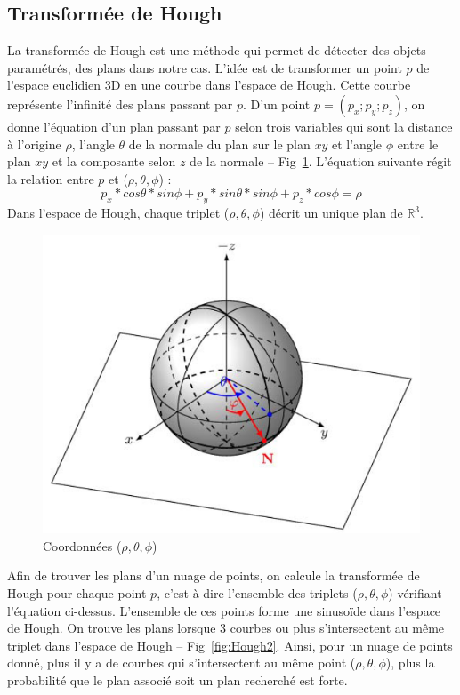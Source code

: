 ﻿\documentclass[12pt, twoside]{article}
\begin{document}
\subsection{Transformée de Hough}
La transformée de Hough est une méthode qui permet de détecter des objets paramétrés, des plans dans notre cas. L’idée est de transformer un point $p$ de l’espace euclidien 3D en une courbe dans l’espace de Hough. Cette courbe représente l’infinité des plans passant par $p$. D’un point $p = (p_x; p_y; p_z)$, on donne l’équation d’un plan passant par $p$ selon trois variables qui sont la distance à l’origine $\rho$, l’angle $\theta$ de la normale du plan sur le plan $xy$ et l’angle $\phi$ entre le plan $xy$ et la composante selon $z$ de la normale -- Fig~\ref{fig:Hough1}. L’équation suivante régit la relation entre $p$ et ($\rho, \theta, \phi$) :
$$p_x*cos\theta * sin\phi + p_y*sin\theta*sin\phi + p_z*cos\phi = \rho$$
Dans l'espace de Hough, chaque triplet ($\rho, \theta, \phi$) décrit un unique plan de $\mathbb{R}^3$.

\begin{figure}[h]
\centering
\includegraphics[scale=0.5]{HoughCoord.png}
\caption{\label{fig:Hough1} Coordonnées ($\rho, \theta, \phi$)}
\end{figure}

Afin de trouver les plans d’un nuage de points, on calcule la transformée de Hough pour chaque point $p$, c’est à dire l’ensemble des triplets ($\rho, \theta, \phi$) vérifiant l’équation ci-dessus. L’ensemble de ces points forme une sinusoïde dans l’espace de Hough. On trouve les plans lorsque 3 courbes ou plus s’intersectent au même triplet dans l’espace de Hough -- Fig~\ref{fig:Hough2}. Ainsi, pour un nuage de points donné, plus il y a de courbes qui s’intersectent au même point ($\rho, \theta, \phi$), plus la probabilité que le plan associé soit un plan recherché est forte.
\end{document}
